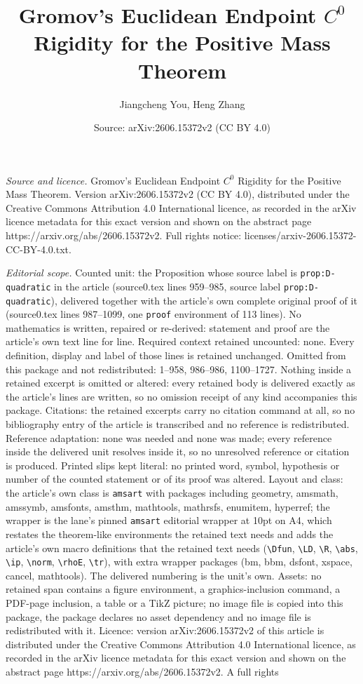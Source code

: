 \documentclass[10pt,a4paper]{amsart}
\title[Gromov's Euclidean Endpoint $C^0$ Rigidity for the Positive ]{Gromov's Euclidean Endpoint $C^0$ Rigidity for the Positive Mass Theorem}
\author{Jiangcheng You, Heng Zhang}
\date{Source: arXiv:2606.15372v2 (CC BY 4.0)}
\begin{document}
\maketitle

\noindent\emph{Source and licence.} Gromov's Euclidean Endpoint $C^0$ Rigidity for the Positive Mass Theorem. Version arXiv:2606.15372v2 (CC BY 4.0), distributed under the Creative Commons Attribution 4.0 International licence, as recorded in the arXiv licence metadata for this exact version and shown on the abstract page https://arxiv.org/abs/2606.15372v2. Full rights notice: licenses/arxiv-2606.15372-CC-BY-4.0.txt.\par\smallskip

\noindent\textit{Editorial scope.} Counted unit: the Proposition whose source label is \texttt{prop:D-quadratic} in the article (source0.tex lines 959--985, source label \texttt{prop:D-quadratic}), delivered together with the article's own complete original proof of it (source0.tex lines 987--1099, one \texttt{proof} environment of 113 lines). No mathematics is written, repaired or re-derived: statement and proof are the article's own text line for line. Required context retained uncounted: none. Every definition, display and label of those lines is retained unchanged. Omitted from this package and not redistributed: 1--958, 986--986, 1100--1727. Nothing inside a retained excerpt is omitted or altered: every retained body is delivered exactly as the article's lines are written, so no omission receipt of any kind accompanies this package. Citations: the retained excerpts carry no citation command at all, so no bibliography entry of the article is transcribed and no reference is redistributed. Reference adaptation: none was needed and none was made; every reference inside the delivered unit resolves inside it, so no unresolved reference or citation is produced. Printed slips kept literal: no printed word, symbol, hypothesis or number of the counted statement or of its proof was altered. Layout and class: the article's own class is \texttt{amsart} with packages including geometry, amsmath, amssymb, amsfonts, amsthm, mathtools, mathrsfs, enumitem, hyperref; the wrapper is the lane's pinned \texttt{amsart} editorial wrapper at 10pt on A4, which restates the theorem-like environments the retained text needs and adds the article's own macro definitions that the retained text needs (\texttt{\textbackslash Dfun}, \texttt{\textbackslash LD}, \texttt{\textbackslash R}, \texttt{\textbackslash abs}, \texttt{\textbackslash ip}, \texttt{\textbackslash norm}, \texttt{\textbackslash rhoE}, \texttt{\textbackslash tr}), with extra wrapper packages (bm, bbm, dsfont, xspace, cancel, mathtools). The delivered numbering is the unit's own. Assets: no retained span contains a figure environment, a graphics-inclusion command, a PDF-page inclusion, a table or a TikZ picture; no image file is copied into this package, the package declares no asset dependency and no image file is redistributed with it. Licence: version arXiv:2606.15372v2 of this article is distributed under the Creative Commons Attribution 4.0 International licence, as recorded in the arXiv licence metadata for this exact version and shown on the abstract page https://arxiv.org/abs/2606.15372v2. A full rights 
\end{document}
